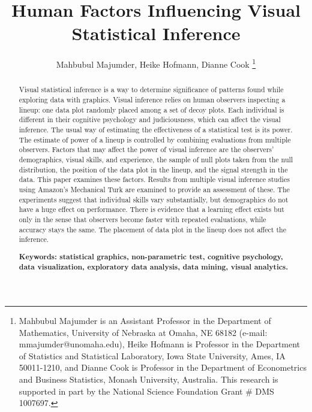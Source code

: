 \documentclass[10pt]{article}\usepackage[]{graphicx}\usepackage[]{color}
\begin{document}

\title{Human Factors Influencing Visual Statistical Inference }
\author{{Mahbubul Majumder, Heike Hofmann, Dianne Cook}
\thanks{Mahbubul Majumder is an Assistant Professor in the Department of Mathematics, University of Nebraska at Omaha, NE 68182 (e-mail: mmajumder@unomaha.edu), Heike Hofmann is Professor in the Department of Statistics and Statistical Laboratory, Iowa State University, Ames, IA 50011-1210, and  Dianne Cook is Professor in the Department of Econometrics and Business Statistics, Monash University, Australia. This research is supported in part by the National Science Foundation Grant \# DMS 1007697.}}
\date{\vspace{-.5in}}
\maketitle

\begin {abstract}  
Visual statistical inference is a way to determine significance of patterns found while  exploring data with graphics.  Visual inference relies on human observers inspecting a lineup: one  data plot randomly placed among a set of decoy plots. Each individual is different in their cognitive psychology and judiciousness, which can affect the visual inference. The usual way of estimating the effectiveness of a statistical test is its power. The estimate of power of a lineup is controlled by combining evaluations from multiple observers. Factors that may  affect the power of visual inference are the observers' demographics, visual skills, and experience, the sample of null plots taken from the null distribution, the position of the data plot in the lineup, and the signal strength in the data. This paper examines these factors. Results from multiple visual inference studies using Amazon's Mechanical Turk are examined to provide an assessment of these. The experiments suggest that individual skills vary substantially,  but demographics do not have a huge effect on performance. There is evidence that a learning effect exists but only in the sense that observers become faster with repeated evaluations, while accuracy stays the same. The placement of data plot in the lineup does not affect the inference.

{\bf Keywords: \sf statistical graphics, non-parametric test, cognitive psychology, data visualization, exploratory data analysis, data mining, visual analytics.} 
\end {abstract}
\end{document}
